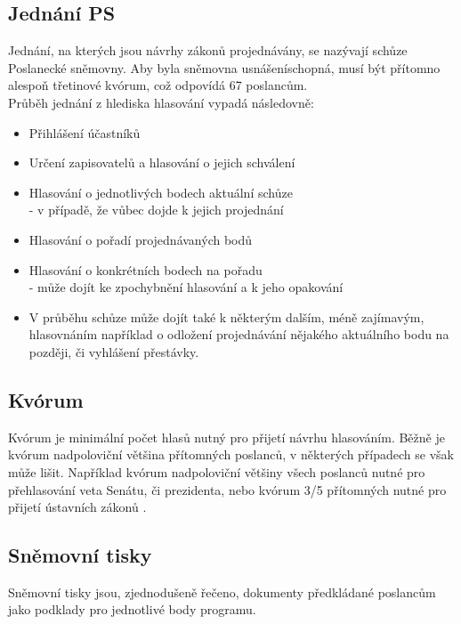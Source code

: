 \subsection{Jednání PS}
\par Jednání, na kterých jsou návrhy zákonů projednávány, se nazývají schůze Poslanecké sněmovny. Aby byla sněmovna usnášeníschopná, musí být přítomno alespoň třetinové kvórum, což odpovídá 67 poslancům. \cite{ustava-kvorum} \\
Průběh jednání z hlediska hlasování vypadá následovně:\\
\begin{itemize}
    \item Přihlášení účastníků
    \item Určení zapisovatelů a hlasování o jejich schválení
    \item Hlasování o jednotlivých bodech aktuální schůze \\
    - v případě, že vůbec dojde k jejich projednání
    \item Hlasování o pořadí projednávaných bodů
    \item Hlasování o konkrétních bodech na pořadu\\
    - může dojít ke zpochybnění hlasování a k jeho opakování \\
    \item V průběhu schůze může dojít také k některým dalším, méně zajímavým, hlasovnáním například o odložení projednávání nějakého aktuálního bodu na později, či vyhlášení přestávky.
    
\end{itemize}

\subsection{Kvórum}
Kvórum je minimální počet hlasů nutný pro přijetí návrhu hlasováním. Běžně je kvórum nadpoloviční většina přítomných poslanců, v některých případech se však může lišit. Například kvórum nadpoloviční většiny všech poslanců nutné pro přehlasování veta Senátu, či prezidenta, nebo kvórum 3/5 přítomných nutné pro přijetí ústavních zákonů \cite{zakon-kvorum}.

\subsection{Sněmovní tisky}
Sněmovní tisky jsou, zjednodušeně řečeno, dokumenty předkládané poslancům jako podklady pro jednotlivé body programu. 

